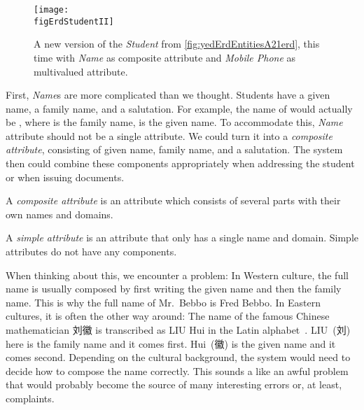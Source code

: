 \begin{figure}%
\centering%
\xdef\figErdStudentII{\currentDir/erdStudent2}%
\texttt{[image: \\figErdStudentII]}%
\caption{A new version of the \emph{Student}  from \cref{fig:yedErdEntitiesA21erd}, this time with \emph{Name} as composite attribute and \emph{Mobile Phone} as multivalued attribute.}%
\label{fig:erdStudent2}%
\end{figure}%
%
First, \emph{Name}s are more complicated than we thought.
Students have a given name, a family name, and a salutation.
For example, the name of  would actually be , where  is the family name,  is the given name.
To accommodate this, \emph{Name} attribute should not be a single attribute.
We could turn it into a \emph{composite attribute}, consisting of given name, family name, and a salutation.
The system then could combine these components appropriately when addressing the student or when issuing documents.%
%
\begin{definition}%
A \emph{composite attribute} is an attribute which consists of several parts with their own names and domains.%
\end{definition}%
\begin{definition}%
A \emph{simple attribute} is an attribute that only has a single name and domain. %
Simple attributes do not have any components.%
\end{definition}%
%
%
When thinking about this, we encounter a problem:
In Western culture, the full name is usually composed by first writing the given name and then the family name.
This is why the full name of Mr.~Bebbo is Fred Bebbo.
In Eastern cultures, it is often the other way around:
The name of the famous Chinese mathematician 刘徽 is transcribed as LIU Hui in the Latin alphabet~\cite{OR2003LH,S1998LHATFGAOCM,Y2024COACMMLHFHTIOMACE}.
LIU~(刘) here is the family name and it comes first.
Hui~(徽) is the given name and it comes second.
Depending on the cultural background, the system would need to decide how to compose the name correctly.
This sounds a like an awful problem that would probably become the source of many interesting errors or, at least, complaints.

